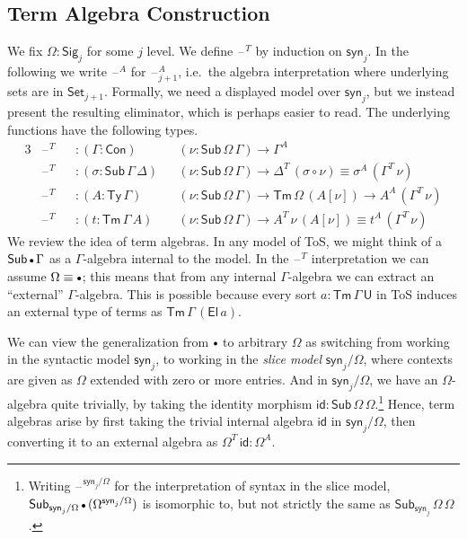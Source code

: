 \documentclass[12pt,a4paper,twoside,openany]{book}
\theoremstyle{remark}
\theoremstyle{definition}
\theoremstyle{theorem}
\newcommand{\id}{\mathsf{id}}
\newcommand{\Con}{\mathsf{Con}}
\newcommand{\Sub}{\mathsf{Sub}}
\newcommand{\Tm}{\mathsf{Tm}}
\newcommand{\Ty}{\mathsf{Ty}}
\newcommand{\U}{\mathsf{U}}
\newcommand{\El}{\mathsf{El}}
\newcommand{\blank}{\mathord{\hspace{1pt}\text{--}\hspace{1pt}}}
\newcommand{\Set}{\mathsf{Set}}
\newcommand{\emptycon}{\scaleobj{.75}\bullet}
\newcommand{\Sig}{\mathsf{Sig}}
\newcommand{\syn}{\mathsf{syn}}
\begin{document}
\subsection{Term Algebra Construction}
\label{sec:fqii-term-algebra-construction}
We fix $\Omega : \Sig_j$ for some $j$ level. We define $\blank^T$ by induction
on $\syn_j$. In the following we write $\blank^A$ for $\blank^A_{j+1}$,
i.e.\ the algebra interpretation where underlying sets are in
$\Set_{j+1}$. Formally, we need a displayed model over $\syn_j$, but we instead
present the resulting eliminator, which is perhaps easier to read. The
underlying functions have the following types.
\begin{alignat*}{3}
  &\blank^T &&: (\Gamma : \Con)&&(\nu : \Sub\,\Omega\,\Gamma) \to \Gamma^A\\
  &\blank^T &&: (\sigma : \Sub\,\Gamma\,\Delta)&&(\nu : \Sub\,\Omega\,\Gamma) \to \Delta^T\,(\sigma \circ \nu) \equiv \sigma^A\,(\Gamma^T\,\nu)\\
  &\blank^T &&: (A : \Ty\,\Gamma)&&(\nu : \Sub\,\Omega\,\Gamma) \to \Tm\,\Omega\,(A[\nu])
  \to A^A\,(\Gamma^T\,\nu)\\
  &\blank^T &&: (t : \Tm\,\Gamma\,A)&&(\nu : \Sub\,\Omega\,\Gamma) \to A^T\,\nu\,(A[\nu]) \equiv t^A\,(\Gamma^T\,\nu)
\end{alignat*}
We review the idea of term algebras. In any model of ToS, we might think of a
$\Sub\,\emptycon\,\Gamma$ as a $\Gamma$-algebra internal to the model. In the
$\blank^T$ interpretation we can assume $\Omega \equiv \emptycon$; this means
that from any internal $\Gamma$-algebra we can extract an ``external''
$\Gamma$-algebra. This is possible because every sort $a : \Tm\,\Gamma\,\U$ in
ToS induces an external type of terms as $\Tm\,\Gamma\,(\El\,a)$.

We can view the generalization from $\emptycon$ to arbitrary $\Omega$ as
switching from working in the syntactic model $\syn_j$, to working in the
\emph{slice model} $\syn_j/\Omega$, where contexts are given as $\Omega$ extended with
zero or more entries. And in $\syn_j/\Omega$, we have an $\Omega$-algebra quite
trivially, by taking the identity morphism $\id :
\Sub\,\Omega\,\Omega$.\footnote{Writing $\blank^{\syn_j/\Omega}$ for the interpretation
of syntax in the slice model,
$\Sub_{\syn_j/\Omega}\,\emptycon\,(\Omega^{\syn_j/\Omega})$ is isomorphic to, but not
strictly the same as $\Sub_{\syn_j}\,\Omega\,\Omega$.} Hence, term algebras
arise by first taking the trivial internal algebra $\id$ in $\syn_j/\Omega$,
then converting it to an external algebra as $\Omega^T\,\id : \Omega^A$.
\end{document}
